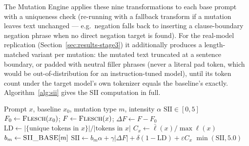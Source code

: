 \documentclass[conference]{IEEEtran}
\begin{document}
The Mutation Engine applies these nine transformations to each base
prompt with a uniqueness check (re-running with a fallback transform
if a mutation leaves text unchanged --- e.g.\ negation falls back to
inserting a clause-boundary negation phrase when no direct negation
target is found). For the real-model replication
(Section~\ref{sec:results-stage3}) it additionally produces a
length-matched variant per mutation: the mutated text truncated at a
sentence boundary, or padded with neutral filler phrases (never a
literal pad token, which would be out-of-distribution for an
instruction-tuned model), until its token count under the target
model's own tokenizer equals the baseline's exactly.
Algorithm~\ref{alg:sii} gives the SII computation in full.
\begin{algorithm}[t]
\caption{Semantic Instability Index}
\label{alg:sii}
\begin{algorithmic}[1]
\REQUIRE Prompt $x$, baseline $x_0$, mutation type $m$, intensity $\alpha$
\ENSURE $\mathrm{SII}\in[0,5]$
\STATE $F_0\gets\textsc{Flesch}(x_0)$; $F\gets\textsc{Flesch}(x)$; $\Delta F\gets F-F_0$
\STATE $\mathrm{LD}\gets|\{\text{unique tokens in }x\}|/|\text{tokens in }x|$
\STATE $C_x\gets\bar\ell(x)/\max\ell(x)$ 
\STATE $b_m\gets\textsc{SII\_BASE}[m]$ 
\STATE $\mathrm{SII}\gets b_m\alpha+\gamma|\Delta F|+\delta(1-\mathrm{LD})+\varepsilon C_x$
\RETURN $\min(\mathrm{SII},5.0)$
\end{algorithmic}
\end{algorithm}
\end{document}
